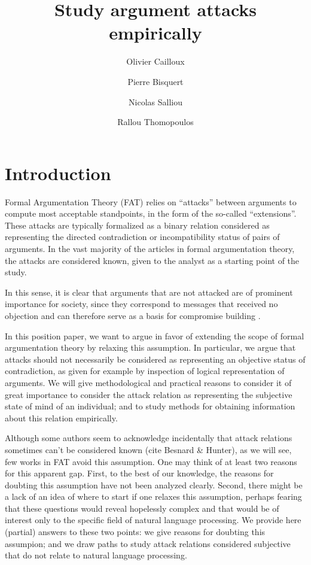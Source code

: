 \documentclass[version=3.21, pagesize, twoside=off, bibliography=totoc, DIV=calc, fontsize=12pt, a4paper, french, english]{scrartcl}
\title{Study argument attacks empirically}
\author{Olivier Cailloux}
\affil{Université Paris-Dauphine, PSL Research University, CNRS, LAMSADE, 75016 PARIS, FRANCE\\
	\href{mailto:olivier.cailloux@dauphine.fr}{olivier.cailloux@dauphine.fr}
}
\author{Pierre Bisquert}
\affil{Affiliation}
\author{Nicolas Salliou}
\affil{Affiliation}
\author{Rallou Thomopoulos}
\affil{IATE, Univ Montpellier, INRAE, Institut Agro, MONTPELLIER, FRANCE\\
	\href{mailto:rallou.thomopoulos@inrae.fr}{rallou.thomopoulos@inrae.fr}
}
\begin{document}
\maketitle

\section{Introduction}
\label{sec:intro}
Formal Argumentation Theory (FAT) \cite{Dung95} relies on “attacks” between arguments to compute most acceptable standpoints, in the form of the so-called “extensions”. These attacks are typically formalized as a binary relation considered as representing the directed contradiction or incompatibility status of pairs of arguments. In the vast majority of the articles in formal argumentation theory, the attacks are considered known, given to the analyst as a starting point of the study. 

In this sense, it is clear that arguments that are not attacked are of prominent importance for society, since they correspond to messages that received no objection and can therefore serve as a basis for compromise building \cite{MoulinBT2018}.{ }

In this position paper, we want to argue in favor of extending the scope of formal argumentation theory by relaxing this assumption. In particular, we argue that attacks should not necessarily be considered as representing an objective status of contradiction, as given for example by inspection of logical representation of arguments. We will give methodological and practical reasons to consider it of great importance to consider the attack relation as representing the subjective state of mind of an individual; and to study methods for obtaining information about this relation empirically.

Although some authors seem to acknowledge incidentally that attack relations sometimes can’t be considered known (cite Besnard \& Hunter), as we will see, few works in FAT avoid this assumption. One may think of at least two reasons for this apparent gap. First, to the best of our knowledge, the reasons for doubting this assumption have not been analyzed clearly. Second, there might be a lack of an idea of where to start if one relaxes this assumption, perhaps fearing that these questions would reveal hopelessly complex and that would be of interest only to the specific field of natural language processing. We provide here (partial) answers to these two points: we give reasons for doubting this assumpion; and we draw paths to study attack relations considered subjective that do not relate to natural language processing.
\end{document}
